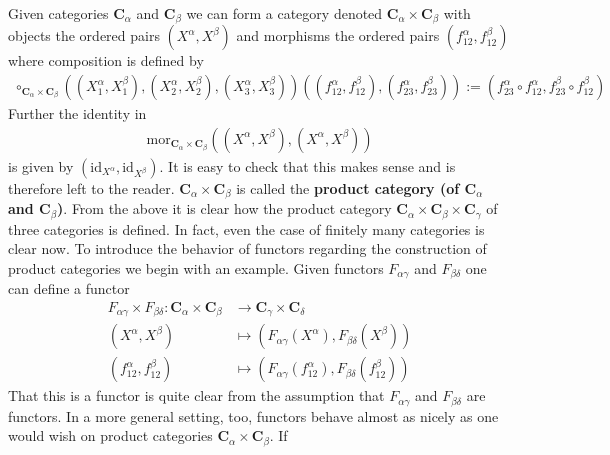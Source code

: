 Given categories $\mathbf{C}_{\alpha}$ and $\mathbf{C}_{\beta}$ we can form a category denoted $\mathbf{C}_{\alpha} \times \mathbf{C}_{\beta}$ with objects the ordered pairs $(X^{\alpha},X^{\beta})$ and morphisms the ordered pairs $(f_{12}^{\alpha},f_{12}^{\beta})$ where composition is defined by
\begin{align*}
  \circ_{\mathbf{C}_{\alpha} \times \mathbf{C}_{\beta}}
  \left(
    (X_{1}^{\alpha},X_{1}^{\beta}),
    (X_{2}^{\alpha},X_{2}^{\beta}),
    (X_{3}^{\alpha},X_{3}^{\beta})
  \right)
  \left(
    (f_{12}^{\alpha},f_{12}^{\beta}),
    (f_{23}^{\alpha},f_{23}^{\beta})
  \right)
  :=
  \left(
    f_{23}^{\alpha}
    \circ
    f_{12}^{\alpha},
    f_{23}^{\beta}
    \circ
    f_{12}^{\beta}
  \right)
\end{align*}
Further the identity in
\begin{align*}
  \mathrm{mor}_{\mathbf{C}_{\alpha}
  \times
  \mathbf{C}_{\beta}}
  \left(
    (X^{\alpha},X^{\beta}),
    (X^{\alpha},X^{\beta})
  \right)
\end{align*}
is given by $(\mathrm{id}_{X^{\alpha}},\mathrm{id}_{X^{\beta}})$. It is easy to check that this makes sense and is therefore left to the reader. $\mathbf{C}_{\alpha} \times \mathbf{C}_{\beta}$ is called the \textbf{product category (of $\mathbf{C}_{\alpha}$ and $\mathbf{C}_{\beta}$)}. From the above it is clear how the product category $\mathbf{C}_{\alpha} \times \mathbf{C}_{\beta} \times\mathbf{C}_{\gamma}$ of three categories is defined. In fact, even the case of finitely many categories is clear now. To introduce the behavior of functors regarding the construction of product categories we begin with an example. Given functors $F_{\alpha\gamma}$ and $F_{\beta\delta}$ one can define a functor
\begin{align*}
  F_{\alpha\gamma}
  \times
  F_{\beta\delta}
  \colon
  \mathbf{C}_{\alpha}
  \times
  \mathbf{C}_{\beta}
  &\rightarrow
  \mathbf{C}_{\gamma}
  \times
  \mathbf{C}_{\delta}
  \\
  (X^{\alpha},X^{\beta})
  &\mapsto
  (F_{\alpha\gamma}(X^{\alpha}),F_{\beta\delta}(X^{\beta}))
  \\
  (f_{12}^{\alpha},f_{12}^{\beta})
  &\mapsto
  \left(
    F_{\alpha\gamma}(f_{12}^{\alpha}),
    F_{\beta\delta}(f_{12}^{\beta})
  \right)
\end{align*}
That this is a functor is quite clear from the assumption that $F_{\alpha\gamma}$ and $F_{\beta\delta}$ are functors. In a more general setting, too, functors behave almost as nicely as one would wish on product categories $\mathbf{C}_{\alpha} \times \mathbf{C}_{\beta}$. If
